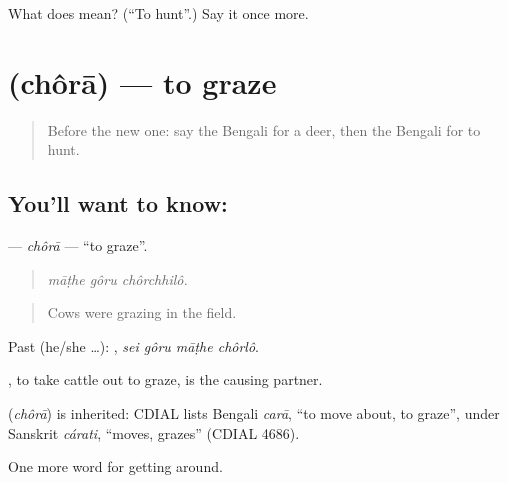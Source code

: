 \begin{tcolorbox}[breakable,colback=teal!4,colframe=teal!35!black,title={Before you move on}]
What does   mean? (\textquotedblleft{}To hunt\textquotedblright{}.) Say it once more.
\end{tcolorbox}
\section[\texorpdfstring{\bn{চরা} (chôrā)}{চরা (chôrā)}]{ (chôrā) — to graze}

\label{lesson:BN-C437-chora}



\begin{quote}
Before the new one: say the Bengali for a deer, then the Bengali for to hunt.
\end{quote}

\subsection*{You'll want to know: }
\textbf{} — \emph{chôrā} — \textquotedblleft{}to graze\textquotedblright{}.

\begin{quote}
  
\end{quote}

\begin{quote}
\emph{māṭhe gôru chôrchhilô.}
\end{quote}

\begin{quote}
Cows were grazing in the field.
\end{quote}

Past (he/she …):    , \emph{sei gôru māṭhe chôrlô}.

, to take cattle out to graze, is the causing partner.

\begin{cousinweb}
\textbf{} (\emph{chôrā}) is inherited: CDIAL lists Bengali \emph{carā}, \textquotedblleft{}to move about, to graze\textquotedblright{}, under Sanskrit \emph{cárati}, \textquotedblleft{}moves, grazes\textquotedblright{} (CDIAL 4686).
\end{cousinweb}

\begin{grammarlens}[title={What you've built}]
One more word for getting around.
\end{grammarlens}


